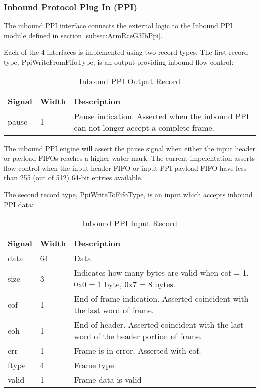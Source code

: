 \documentclass[11pt]{article}
\begin{document}
\subsubsection{Inbound Protocol Plug In (PPI)}
\label{subsubsec:external_ib_ppi}

The inbound PPI interface connects the external logic to the Inbound PPI module defined in section \ref{subsec:ArmRceG3IbPpi}.

Each of the 4 interfaces is implemented using two record types. The first record type, PpiWriteFromFifoType, 
is an output providing inbound flow control:

\begin{table}[H]
\small
\centering
   \begin{tabular}{| l | l | l | }
      \hline \textbf{Signal} & \textbf{Width}  & \textbf{Description} \\
      \hline pause  & 1  & Pause indication. Asserted when the inbound PPI can not longer accept a complete frame. \\
      \hline
   \end{tabular}
   \caption{Inbound PPI Output Record}
\end{table}

The inbound PPI engine will assert the pause signal when either the input header or payload FIFOs reaches a higher water mark. 
The current impelentation asserts flow control when the input header FIFO or input PPI payload FIFO have less than 255 (out of 512) 
64-bit entries available.

The second record type, PpiWriteToFifoType, is an input which accepts inbound PPI data:

\begin{table}[H]
\small
\centering
   \begin{tabular}{| l | l | l | }
      \hline \textbf{Signal} & \textbf{Width}  & \textbf{Description} \\
      \hline data    & 64    & Data       \\
      \hline size    & 3     & Indicates how many bytes are valid when eof = 1. 0x0 = 1 byte, 0x7 = 8 bytes.       \\
      \hline eof     & 1     & End of frame indication. Asserted coincident with the last word of frame.       \\
      \hline eoh     & 1     & End of header. Asserted coincident with the last word of the header portion of frame.       \\
      \hline err     & 1     & Frame is in error. Asserted with eof.       \\
      \hline ftype   & 4     & Frame type       \\
      \hline valid   & 1     & Frame data is valid       \\
      \hline
   \end{tabular}
   \caption{Inbound PPI Input Record}
\end{table}
\end{document}
